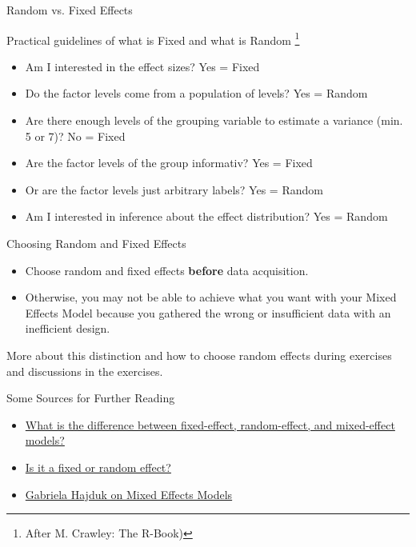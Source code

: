 \documentclass{beamer}
\begin{document}
\begin{frame}{Random vs. Fixed Effects}

Practical guidelines of what is Fixed and what is Random \footnote{After M. Crawley: The R-Book)}

  \begin{itemize}
    \item Am I interested in the effect sizes? Yes = Fixed
    \item Do the factor levels come from a population of levels? Yes = Random
    \item Are there enough levels of the grouping variable to estimate a variance (min. 5 or 7)? No = Fixed
    \item Are the factor levels of the group informativ? Yes = Fixed 
    \item Or are the factor levels just arbitrary labels? Yes = Random
    \item Am I interested in inference about the effect distribution? Yes = Random 
    
  \end{itemize}
\end{frame}


\begin{frame}{Choosing Random and Fixed Effects}
  \begin{itemize}
    \item Choose random and fixed effects \textbf{before} data acquisition.
    \item Otherwise, you may not be able to achieve what you want with your Mixed Effects Model because you gathered the wrong or insufficient data with an inefficient design.
  \end{itemize}

  More about this distinction and how to choose random effects during exercises and discussions in the exercises.
  
\end{frame}

\begin{frame}{Some Sources for Further Reading}
  \begin{itemize}
    \item \href{https://stats.stackexchange.com/questions/4700/what-is-the-difference-between-fixed-effect-random-effect-and-mixed-effect-mode/4702\#4702}{What is the difference between fixed-effect, random-effect, and mixed-effect models?}
    \item \href{https://dynamicecology.wordpress.com/2015/11/04/is-it-a-fixed-or-random-effect/}{Is it a fixed or random effect?}
    \item \href{https://gkhajduk.github.io/2017-03-09-mixed-models/}{Gabriela Hajduk on Mixed Effects Models}
  \end{itemize}
\end{frame}
\end{document}
